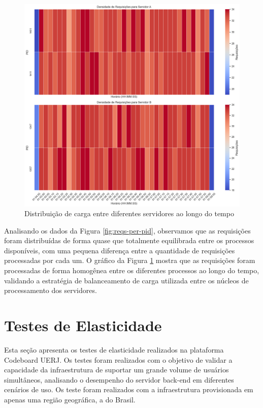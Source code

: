 \begin{figure}[H]
    \centering
    \includegraphics[width=1\textwidth]{assets/balance-test/reqs-per-pid-over-time.png}
    \caption{Distribuição de carga entre diferentes servidores ao longo do tempo}
    \label{fig:reqs-per-pid-over-time}
\end{figure}

Analisando os dados da Figura \ref{fig:reqs-per-pid}, observamos que as requisições foram distribuídas de forma quase que totalmente equilibrada entre os processos disponíveis, com uma pequena diferença entre a quantidade de requisições processadas por cada um. O gráfico da Figura \ref{fig:reqs-per-pid-over-time} mostra que as requisições foram processadas de forma homogênea entre os diferentes processos ao longo do tempo, validando a estratégia de balanceamento de carga utilizada entre os núcleos de processamento dos servidores.


\section{Testes de Elasticidade}

Esta seção apresenta os testes de elasticidade realizados na plataforma Codeboard UERJ. Os testes foram realizados com o objetivo de validar a capacidade da infraestrutura de suportar um grande volume de usuários simultâneos, analisando o desempenho do servidor back-end em diferentes cenários de uso. Os teste foram realizados com a infraestrutura provisionada em apenas uma região geográfica, a do Brasil.


